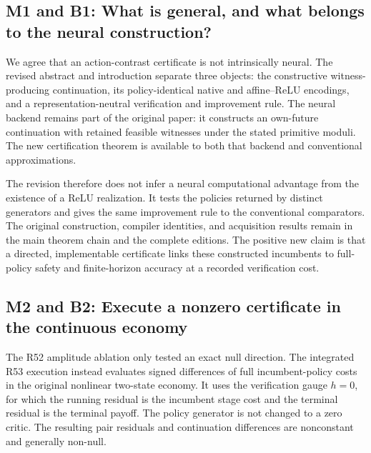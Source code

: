 \hypertarget{m1-and-b1-what-is-general-and-what-belongs-to-the-neural-construction}{%
\subsection{M1 and B1: What is general, and what belongs to the neural
construction?}\label{m1-and-b1-what-is-general-and-what-belongs-to-the-neural-construction}}

We agree that an action-contrast certificate is not intrinsically
neural. The revised abstract and introduction separate three objects:
the constructive witness-producing continuation, its policy-identical
native and affine--ReLU encodings, and a representation-neutral
verification and improvement rule. The neural backend remains part of
the original paper: it constructs an own-future continuation with
retained feasible witnesses under the stated primitive moduli. The new
certification theorem is available to both that backend and conventional
approximations.

The revision therefore does not infer a neural computational advantage
from the existence of a ReLU realization. It tests the policies returned
by distinct generators and gives the same improvement rule to the
conventional comparators. The original construction, compiler
identities, and acquisition results remain in the main theorem chain and
the complete editions. The positive new claim is that a directed,
implementable certificate links these constructed incumbents to
full-policy safety and finite-horizon accuracy at a recorded
verification cost.

\hypertarget{m2-and-b2-execute-a-nonzero-certificate-in-the-continuous-economy}{%
\subsection{M2 and B2: Execute a nonzero certificate in the continuous
economy}\label{m2-and-b2-execute-a-nonzero-certificate-in-the-continuous-economy}}

The R52 amplitude ablation only tested an exact null direction. The
integrated R53 execution instead evaluates signed differences of full
incumbent-policy costs in the original nonlinear two-state economy. It
uses the verification gauge \(h=0\), for which the running residual is
the incumbent stage cost and the terminal residual is the terminal
payoff. The policy generator is not changed to a zero critic. The
resulting pair residuals and continuation differences are nonconstant
and generally non-null.

